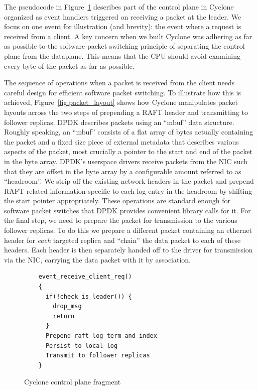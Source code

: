 \documentclass[10pt, preprint, nonatbib]{sigplanconf}
\begin{document}
The pseudocode in Figure~\ref{fig:control_plane} describes part of the control
plane in Cyclone organized as event handlers triggered on receiving a packet at
the leader. We focus on one event for illustration (and brevity): the event
where a request is received from a client. A key concern when we built Cyclone
was adhering as far as possible to the software packet switching principle of
separating the control plane from the dataplane. This means that the CPU should
avoid examining every byte of the packet as far as possible.

The sequence of operations when a packet is received from the client needs
careful design for efficient software packet switching. To illustrate how this
is achieved, Figure~\ref{fig:packet_layout} shows how Cyclone manipulates packet
layouts across the two steps of prepending a RAFT header and transmitting to
follower replicas. DPDK describes packets using an ``mbuf'' data
structure. Roughly speaking, an ``mbuf'' consists of a flat array of bytes
actually containing the packet and a fixed size piece of external metadata that
describes various aspects of the packet, most crucially a pointer to the start
and end of the packet in the byte array. DPDK's userspace drivers receive
packets from the NIC such that they are offset in the byte array by a
configurable amount referred to as ``headroom''. We strip off the existing
network headers in the packet and prepend RAFT related information specific to
each log entry in the headroom by shifting the start pointer appropriately.
These operations are standard enough for software packet switches that DPDK
provides convenient library calls for it. For the final step, we need to prepare
the packet for transmission to the various follower replicas. To do this we
prepare a different packet containing an ethernet header for \emph{each}
targeted replica and ``chain'' the data packet to each of these headers. Each
header is then separately handed off to the driver for transmission via the NIC,
carrying the data packet with it by association.

\begin{figure}
\begin{verbatim}
    event_receive_client_req()
    {
      if(!check_is_leader()) {
        drop_msg
        return
      }
      Prepend raft log term and index
      Persist to local log
      Transmit to follower replicas
    }
\end{verbatim}
\caption{Cyclone control plane fragment}
\label{fig:control_plane}
\end{figure}
\end{document}
